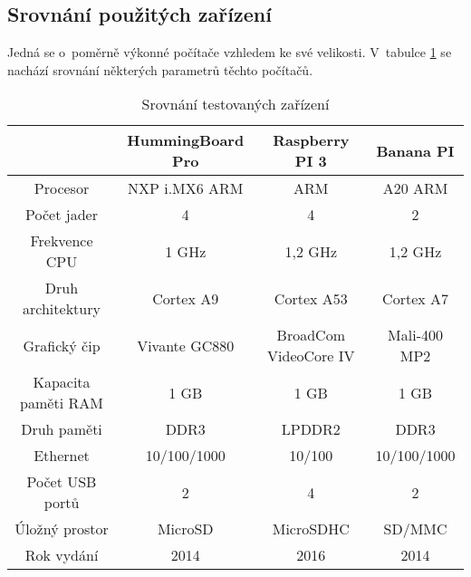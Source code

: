 \subsection{Srovnání použitých zařízení}
Jedná se o~poměrně výkonné počítače vzhledem ke své velikosti. V~tabulce \ref{srovnaniPC} se nachází srovnání některých parametrů těchto počítačů.
\begin{table}[H]
\centering
\caption{Srovnání testovaných zařízení}
\begin{tabular} { |c|c|c|c| }
\hline
{}                  & {HummingBoard Pro}    & {Raspberry PI 3}      & {Banana PI}          \\ \hline
Procesor            & NXP i.MX6 ARM         & ARM                   & A20 ARM              \\ \hline
Počet jader         & 4                     & 4                     & 2                    \\ \hline
Frekvence CPU            & 1 GHz                 & 1,2 GHz               & 1,2 GHz              \\ \hline
Druh architektury   & Cortex A9             & Cortex A53            & Cortex A7            \\ \hline
Grafický čip        & Vivante GC880         & BroadCom VideoCore IV & Mali-400 MP2         \\ \hline
Kapacita paměti RAM & 1 GB                  & 1 GB                  & 1 GB                 \\ \hline
Druh paměti         & DDR3                  & LPDDR2                & DDR3                 \\ \hline
Ethernet            & 10/100/1000           & 10/100                & 10/100/1000          \\ \hline
Počet USB portů     & 2                     & 4                     & 2                    \\ \hline
Úložný prostor      & MicroSD               & MicroSDHC             & SD/MMC               \\ \hline
Rok vydání          & 2014                  & 2016                  & 2014                 \\ \hline
\end{tabular}
\label{srovnaniPC}
\end{table}

